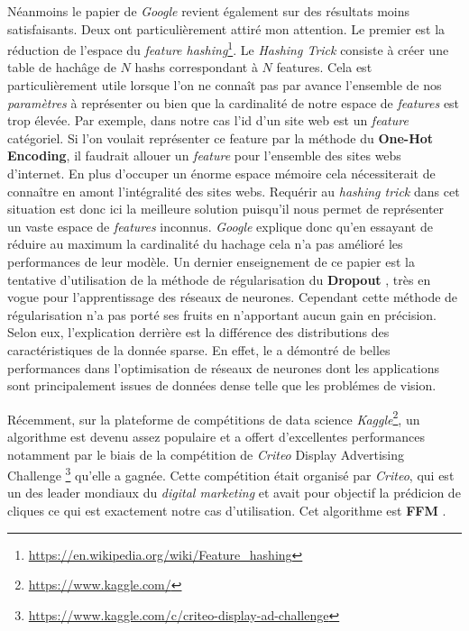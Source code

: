     Néanmoins le papier de \emph{Google} revient également sur des résultats moins satisfaisants. Deux ont particulièrement attiré mon attention. Le premier est la réduction de l'espace du \emph{feature hashing}\footnote{\url{https://en.wikipedia.org/wiki/Feature_hashing}}. Le \emph{Hashing Trick} consiste à créer une table de hachâge de $N$ hashs correspondant à $N$ features. Cela est particulièrement utile lorsque l'on ne connaît pas par avance l'ensemble de nos \emph{paramètres} à représenter ou bien que la cardinalité de notre espace de \emph{features} est trop élevée. Par exemple, dans notre cas l'id d'un site web est un \emph{feature} catégoriel. Si l'on voulait représenter ce feature par la méthode du \textbf{One-Hot Encoding}, il faudrait allouer un \emph{feature} pour l'ensemble des sites webs d'internet. En plus d'occuper un énorme espace mémoire cela nécessiterait de connaître en amont l'intégralité des sites webs. Requérir au \emph{hashing trick} dans cet situation est donc ici la meilleure solution puisqu'il nous permet de représenter un vaste espace de \emph{features} inconnus. \emph{Google} explique donc qu'en essayant de réduire au maximum la cardinalité du hachage cela n'a pas amélioré les performances de leur modèle. \newline
    Un dernier enseignement de ce papier est la tentative d'utilisation de la méthode de régularisation du \textbf{Dropout} \cite{tinto1975dropout}, très en vogue pour l'apprentissage des réseaux de neurones. Cependant cette méthode de régularisation n'a pas porté ses fruits en n'apportant aucun gain en précision. Selon eux, l'explication derrière est la différence des distributions des caractéristiques de la donnée sparse. En effet, le  a démontré de belles performances dans l'optimisation de réseaux de neurones dont les applications sont principalement issues de données dense telle que les problémes de vision. \par
    
    Récemment, sur la plateforme de compétitions de data science \emph{Kaggle}\footnote{\url{https://www.kaggle.com/}}, un algorithme est devenu assez populaire et a offert d'excellentes performances notamment par le biais de la compétition de \emph{Criteo} \fg Display Advertising Challenge \og \footnote{\url{https://www.kaggle.com/c/criteo-display-ad-challenge}} qu'elle a gagnée. Cette compétition était organisé par \emph{Criteo}, qui est un des leader mondiaux du \emph{digital marketing} et avait pour objectif la prédicion de  cliques ce qui est exactement notre cas d'utilisation. Cet algorithme est \textbf{FFM} \cite{juan2016field}. \par
    
